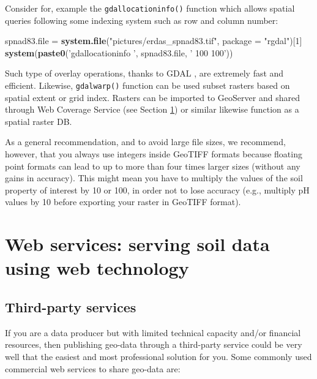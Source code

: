 \documentclass[10pt,b5paper,]{book}
\newenvironment{Shaded}{\begin{snugshade}}{\end{snugshade}}
\newcommand{\DataTypeTok}[1]{\textcolor[rgb]{0.13,0.29,0.53}{#1}}
\newcommand{\DecValTok}[1]{\textcolor[rgb]{0.00,0.00,0.81}{#1}}
\newcommand{\KeywordTok}[1]{\textcolor[rgb]{0.13,0.29,0.53}{\textbf{#1}}}
\newcommand{\NormalTok}[1]{#1}
\newcommand{\StringTok}[1]{\textcolor[rgb]{0.31,0.60,0.02}{#1}}
\theoremstyle{definition}
\theoremstyle{definition}
\theoremstyle{definition}
\theoremstyle{remark}
\begin{document}
Consider for, example the \texttt{gdallocationinfo()} function which
allows spatial queries following some indexing system such as row and
column number:

\begin{Shaded}
\begin{Highlighting}[]
\NormalTok{spnad83.file =}\StringTok{ }\KeywordTok{system.file}\NormalTok{(}\StringTok{"pictures/erdas_spnad83.tif"}\NormalTok{, }
                           \DataTypeTok{package =} \StringTok{"rgdal"}\NormalTok{)[}\DecValTok{1}\NormalTok{]}
\KeywordTok{system}\NormalTok{(}\KeywordTok{paste0}\NormalTok{(}\StringTok{'gdallocationinfo '}\NormalTok{, spnad83.file, }\StringTok{' 100 100'}\NormalTok{))}
\end{Highlighting}
\end{Shaded}

Such type of overlay operations, thanks to GDAL
\citep{warmerdam_geospatial_2008}, are extremely fast and efficient.
Likewise, \texttt{gdalwarp()} function can be used subset rasters based
on spatial extent or grid index. Rasters can be imported to GeoServer
and shared through Web Coverage Service (see Section \ref{webService})
or similar likewise function as a spatial raster DB.

As a general recommendation, and to avoid large file sizes, we
recommend, however, that you always use integers inside GeoTIFF formats
because floating point formats can lead to up to more than four times
larger sizes (without any gains in accuracy). This might mean you have
to multiply the values of the soil property of interest by 10 or 100, in
order not to lose accuracy (e.g., multiply pH values by 10 before
exporting your raster in GeoTIFF format).

\hypertarget{webService}{%
\section{Web services: serving soil data using web
technology}\label{webService}}

\hypertarget{third-party-services}{%
\subsection{Third-party services}\label{third-party-services}}

If you are a data producer but with limited technical capacity and/or
financial resources, then publishing geo-data through a third-party
service could be very well that the easiest and most professional
solution for you. Some commonly used commercial web services to share
geo-data are:
\end{document}
